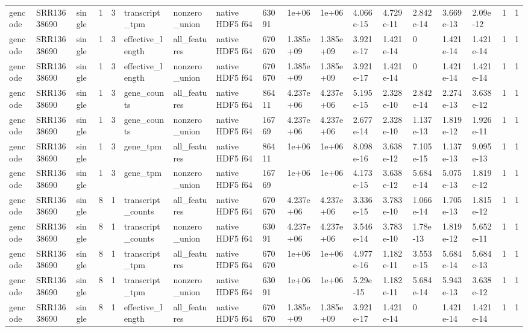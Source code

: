 \begin{tabular}{llllllllllllllllll}
gencode & SRR13638690 & single & 1 & 3 & transcript\_tpm & nonzero\_union & native HDF5 f64 & 63091 & 1e+06 & 1e+06 & 4.066e-15 & 4.729e-11 & 2.842e-14 & 3.669e-13 & 2.09e-12 & 1 & 1 \\
gencode & SRR13638690 & single & 1 & 3 & effective\_length & all\_features & native HDF5 f64 & 670670 & 1.385e+09 & 1.385e+09 & 3.921e-17 & 1.421e-14 & 0 & 1.421e-14 & 1.421e-14 & 1 & 1 \\
gencode & SRR13638690 & single & 1 & 3 & effective\_length & nonzero\_union & native HDF5 f64 & 670670 & 1.385e+09 & 1.385e+09 & 3.921e-17 & 1.421e-14 & 0 & 1.421e-14 & 1.421e-14 & 1 & 1 \\
gencode & SRR13638690 & single & 1 & 3 & gene\_counts & all\_features & native HDF5 f64 & 86411 & 4.237e+06 & 4.237e+06 & 5.195e-15 & 2.328e-10 & 2.842e-14 & 2.274e-13 & 3.638e-12 & 1 & 1 \\
gencode & SRR13638690 & single & 1 & 3 & gene\_counts & nonzero\_union & native HDF5 f64 & 16769 & 4.237e+06 & 4.237e+06 & 2.677e-14 & 2.328e-10 & 1.137e-13 & 1.819e-12 & 1.926e-11 & 1 & 1 \\
gencode & SRR13638690 & single & 1 & 3 & gene\_tpm & all\_features & native HDF5 f64 & 86411 & 1e+06 & 1e+06 & 8.098e-16 & 3.638e-12 & 7.105e-15 & 1.137e-13 & 9.095e-13 & 1 & 1 \\
gencode & SRR13638690 & single & 1 & 3 & gene\_tpm & nonzero\_union & native HDF5 f64 & 16769 & 1e+06 & 1e+06 & 4.173e-15 & 3.638e-12 & 5.684e-14 & 5.075e-13 & 1.819e-12 & 1 & 1 \\
gencode & SRR13638690 & single & 8 & 1 & transcript\_counts & all\_features & native HDF5 f64 & 670670 & 4.237e+06 & 4.237e+06 & 3.336e-15 & 3.783e-10 & 1.066e-14 & 1.705e-13 & 1.815e-12 & 1 & 1 \\
gencode & SRR13638690 & single & 8 & 1 & transcript\_counts & nonzero\_union & native HDF5 f64 & 63091 & 4.237e+06 & 4.237e+06 & 3.546e-14 & 3.783e-10 & 1.78e-13 & 1.819e-12 & 5.652e-11 & 1 & 1 \\
gencode & SRR13638690 & single & 8 & 1 & transcript\_tpm & all\_features & native HDF5 f64 & 670670 & 1e+06 & 1e+06 & 4.977e-16 & 1.182e-11 & 3.553e-15 & 5.684e-14 & 5.684e-13 & 1 & 1 \\
gencode & SRR13638690 & single & 8 & 1 & transcript\_tpm & nonzero\_union & native HDF5 f64 & 63091 & 1e+06 & 1e+06 & 5.29e-15 & 1.182e-11 & 5.684e-14 & 5.943e-13 & 3.638e-12 & 1 & 1 \\
gencode & SRR13638690 & single & 8 & 1 & effective\_length & all\_features & native HDF5 f64 & 670670 & 1.385e+09 & 1.385e+09 & 3.921e-17 & 1.421e-14 & 0 & 1.421e-14 & 1.421e-14 & 1 & 1 \\

\end{tabular}

